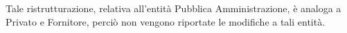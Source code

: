 \noindent{}
\newline\newline
Tale ristrutturazione, relativa all'entità Pubblica Amministrazione, è analoga a Privato e Fornitore, perciò non vengono riportate le modifiche a tali entità.
